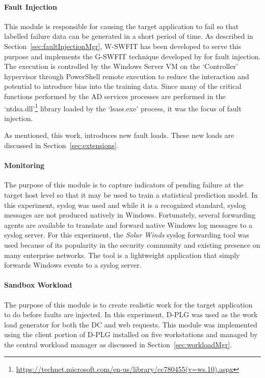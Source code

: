 \paragraph{Fault Injection} \label{sec:faultInjectionTool} 
This module is responsible for causing the target application to fail so that
labelled failure data can be generated in a short period of time.  As described
in Section~\ref{sec:faultInjectionMgr}, \ac{W-SWFIT} has been developed to
serve this purpose and implements the \ac{G-SWFIT} technique developed by
\citet{gswfit} for fault injection.  The execution is controlled by the Windows
Server \ac{VM} on the `Controller' hypervisor through PowerShell remote
execution to reduce the interaction and potential to introduce bias into the
training data.  Since many of the critical functions performed by the \ac{AD}
services processes are performed in the
`ntdsa.dll'\footnote{\url{https://technet.microsoft.com/en-us/library/cc780455(v=ws.10).aspx}}
library loaded by the `lsass.exe' process, it was the focus of fault injection.

As mentioned, this work, introduces new fault loads.  These new loads are
discussed in Section~\ref{sec:extensions}.

\paragraph{Monitoring} \label{sec:sandboxMonitoringTool} 
The purpose of this module is to capture indicators of pending failure at the
target host level so that it may be used to train a statistical prediction
model.  In this experiment, syslog was used and while it is a recognized
standard, syslog messages are not produced natively in Windows.  Fortunately,
several forwarding agents are available to translate and forward native Windows
log messages to a syslog server.  For this experiment, the \emph{Solar Winds}
syslog forwarding tool was used because of its popularity in the security
community and existing presence on many enterprise networks.  The tool is a
lightweight application that simply forwards Windows events to a syslog server.

\paragraph{Sandbox Workload}  \label{sec:sandboxWorkload} 
The purpose of this module is to create realistic work for the target
application to do before faults are injected.  In this experiment, \ac{D-PLG}
was used as the work load generator for both the \ac{DC} and web requests.
This module was implemented using the client portion of \ac{D-PLG} installed on
five workstations and managed by the central workload manager as discussed in
Section~\ref{sec:workloadMgr}.

